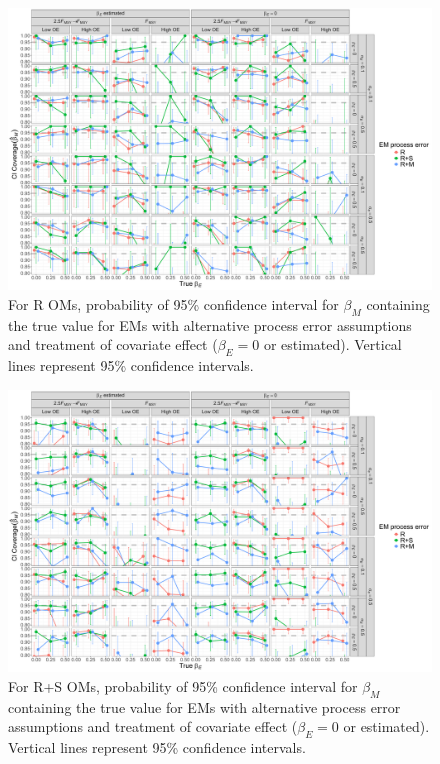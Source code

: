 \documentclass[
  12pt,
]{article}
\begin{document}
\begin{landscape}
\begin{figure}
\begin{center}
\includegraphics[height = \textheight]{beta_M_CI_coverage_Rom}
\end{center}
\caption{For R OMs, probability of 95\% confidence interval for $\beta_M$ containing the true value for EMs with alternative process error assumptions and treatment of covariate effect ($\beta_E = 0$ or estimated). Vertical lines represent 95\% confidence intervals.}\label{beta_M_CI_coverage_Rom}
\end{figure}
\end{landscape}

\begin{landscape}
\begin{figure}
\begin{center}
\includegraphics[height = \textheight]{beta_M_CI_coverage_RSom}
\end{center}
\caption{For R+S OMs, probability of 95\% confidence interval for $\beta_M$ containing the true value for EMs with alternative process error assumptions and treatment of covariate effect ($\beta_E = 0$ or estimated). Vertical lines represent 95\% confidence intervals.}\label{beta_M_CI_coverage_RSom}
\end{figure}
\end{landscape}
\end{document}
